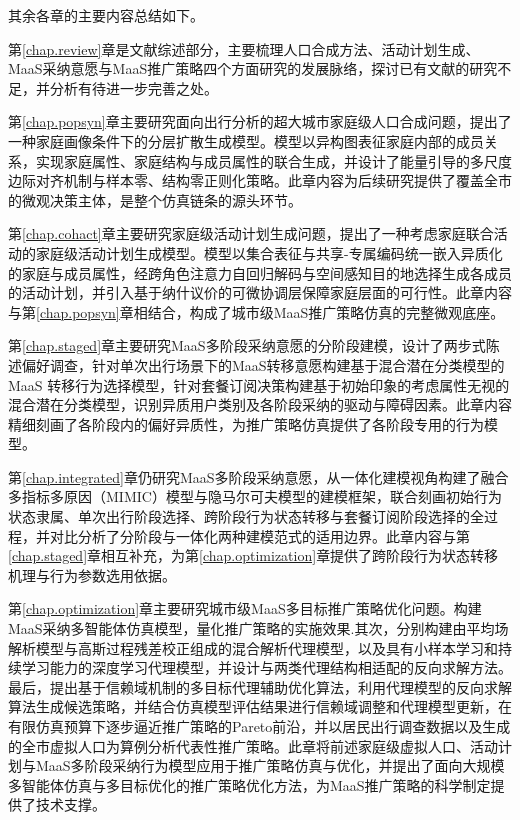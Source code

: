 其余各章的主要内容总结如下。

第\ref{chap.review}章是文献综述部分，主要梳理人口合成方法、活动计划生成、MaaS采纳意愿与MaaS推广策略四个方面研究的发展脉络，探讨已有文献的研究不足，并分析有待进一步完善之处。

第\ref{chap.popsyn}章主要研究面向出行分析的超大城市家庭级人口合成问题，提出了一种家庭画像条件下的分层扩散生成模型。模型以异构图表征家庭内部的成员关系，实现家庭属性、家庭结构与成员属性的联合生成，并设计了能量引导的多尺度边际对齐机制与样本零、结构零正则化策略。此章内容为后续研究提供了覆盖全市的微观决策主体，是整个仿真链条的源头环节。

第\ref{chap.cohact}章主要研究家庭级活动计划生成问题，提出了一种考虑家庭联合活动的家庭级活动计划生成模型。模型以集合表征与共享-专属编码统一嵌入异质化的家庭与成员属性，经跨角色注意力自回归解码与空间感知目的地选择生成各成员的活动计划，并引入基于纳什议价的可微协调层保障家庭层面的可行性。此章内容与第\ref{chap.popsyn}章相结合，构成了城市级MaaS推广策略仿真的完整微观底座。

第\ref{chap.staged}章主要研究MaaS多阶段采纳意愿的分阶段建模，设计了两步式陈述偏好调查，针对单次出行场景下的MaaS转移意愿构建基于混合潜在分类模型的 MaaS 转移行为选择模型，针对套餐订阅决策构建基于初始印象的考虑属性无视的混合潜在分类模型，识别异质用户类别及各阶段采纳的驱动与障碍因素。此章内容精细刻画了各阶段内的偏好异质性，为推广策略仿真提供了各阶段专用的行为模型。

第\ref{chap.integrated}章仍研究MaaS多阶段采纳意愿，从一体化建模视角构建了融合多指标多原因（MIMIC）模型与隐马尔可夫模型的建模框架，联合刻画初始行为状态隶属、单次出行阶段选择、跨阶段行为状态转移与套餐订阅阶段选择的全过程，并对比分析了分阶段与一体化两种建模范式的适用边界。此章内容与第\ref{chap.staged}章相互补充，为第\ref{chap.optimization}章提供了跨阶段行为状态转移机理与行为参数选用依据。

第\ref{chap.optimization}章主要研究城市级MaaS多目标推广策略优化问题。构建MaaS采纳多智能体仿真模型，量化推广策略的实施效果.其次，分别构建由平均场解析模型与高斯过程残差校正组成的混合解析代理模型，以及具有小样本学习和持续学习能力的深度学习代理模型，并设计与两类代理结构相适配的反向求解方法。最后，提出基于信赖域机制的多目标代理辅助优化算法，利用代理模型的反向求解算法生成候选策略，并结合仿真模型评估结果进行信赖域调整和代理模型更新，在有限仿真预算下逐步逼近推广策略的Pareto前沿，并以居民出行调查数据以及生成的全市虚拟人口为算例分析代表性推广策略。此章将前述家庭级虚拟人口、活动计划与MaaS多阶段采纳行为模型应用于推广策略仿真与优化，并提出了面向大规模多智能体仿真与多目标优化的推广策略优化方法，为MaaS推广策略的科学制定提供了技术支撑。

